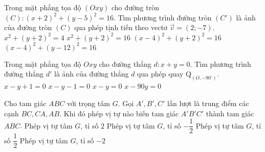 \begin{ex}%
	Trong mặt phẳng tọa độ $\left(Oxy\right)$  cho đường tròn $\left(C\right):\left(x+2\right)^2+\left(y-5\right)^2=16$.  Tìm phương trình đường tròn $\left(C'\right)$  là ảnh của đường tròn  $\left(C\right)$ qua phép tịnh tiến theo vectơ  $\overrightarrow{v}=\left(2;-7\right)$.
	\choice
	{$x^2+\left(y+2\right)^2=4$}
	{\True $x^2+\left(y+2\right)^2=16$}
	{$\left(x-4\right)^2+\left(y+2\right)^2=16$}
	{$\left(x-4\right)^2+\left(y-12\right)^2=16$}
\end{ex}
\begin{ex}%
	Trong mặt phẳng tọa độ $Oxy$ cho đường thẳng $d:x+y=0$.  Tìm phương trình đường thẳng $d'$  là ảnh của đường thẳng $d$ qua phép quay $\mathrm{Q}_{\left(O,-90^{\circ}\right)}$.
	\choice
	{$x-y+1=0$}
	{$x-y-1=0$}
	{\True $x-y=0$}
	{$x-90y=0$}
\end{ex}
\begin{ex}%
	Cho tam giác $ABC$ với trọng tâm $G$. Gọi $A', B', C'$  lần lượt là trung điểm các cạnh $BC, CA, AB$. Khi đó phép vị tự nào biến tam giác $A'B'C'$  thành tam giác $ABC$. 
	\choice
	{Phép vị tự tâm $G$, tỉ số $2$  }
	{Phép vị tự tâm $G$, tỉ số $-\dfrac{1}{2}$  }
	{Phép vị tự tâm $G$, tỉ số $\dfrac{1}{2}$  }
	{\True Phép vị tự tâm $G$, tỉ số $-2$  }
\end{ex}
